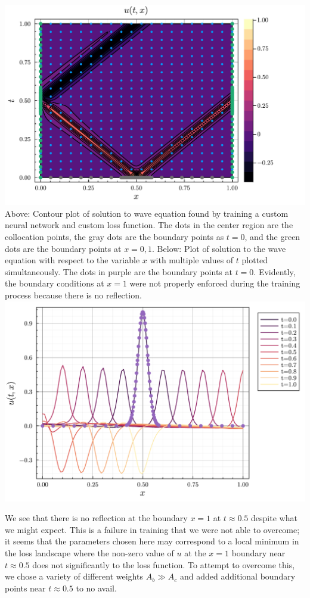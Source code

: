 \documentclass[11pt]{article}
\newcommand{\1}{\mathbf 1}
\begin{document}
\begin{singlespace}
\begin{center}
	\includegraphics[width=0.9\linewidth]{fig/custom_wave_eq_contour.pdf}
	\\
	Above: Contour plot of solution to wave equation found by training a custom neural network and custom loss function.
	The dots in the center region are the collocation points, the gray dots are the boundary points as $t = 0$, and the green dots are the boundary points at $x = 0,1$.
	Below:
	Plot of solution to the wave equation with respect to the variable $x$ with multiple values of $t$ plotted simultaneously.
	The dots in purple are the boundary points at $t = 0$.
	Evidently, the boundary conditions at $x = 1$ were not properly enforced during the training process because there is no reflection.
	\\
	\includegraphics[width=0.9\linewidth]{fig/custom_wave_eq_x.pdf}
\end{center}
\end{singlespace}
We see that there is no reflection at the boundary $x = 1$ at $t \approx 0.5$ despite what we might expect.
This is a failure in training that we were not able to overcome; it seems that the parameters chosen here may correspond to a local minimum in the loss landscape where the non-zero value of $u$ at the $x = 1$ boundary near $t \approx 0.5$ does not significantly to the loss function.
To attempt to overcome this, we chose a variety of different weights $A_b \gg A_c$ and added additional boundary points near $t \approx 0.5$ to no avail.
\end{document}
